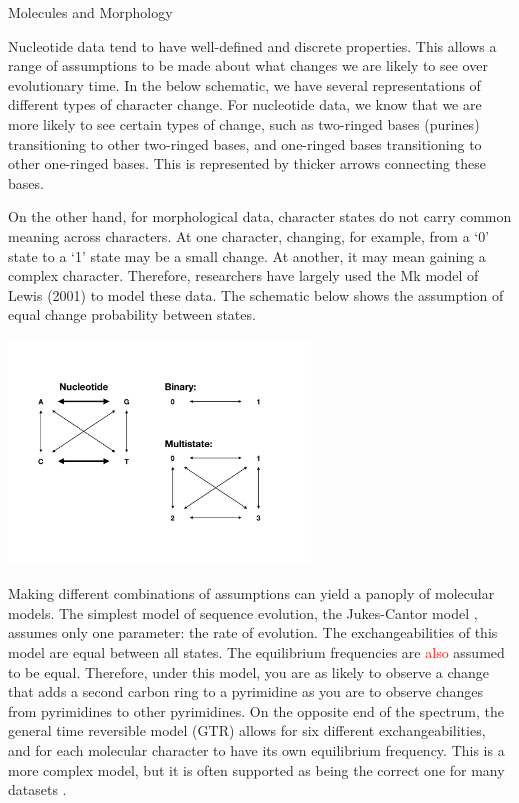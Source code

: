 \documentclass[11pt]{article}
\newcommand{\edit}[1]{{\textcolor{red}{#1}}} %
\begin{document}
\begin{boxedtext}{Molecules and Morphology}

Nucleotide data tend to have well-defined and discrete properties.
This allows a range of assumptions to be made about what changes we are likely to see over evolutionary time.
In the below schematic, we have several representations of different types of character change.
For nucleotide data, we know that we are more likely to see certain types of change, such as two-ringed bases (purines) transitioning to other two-ringed bases, and one-ringed bases transitioning to other one-ringed bases.
This is represented by thicker arrows connecting these bases.

On the other hand, for morphological data, character states do not carry common meaning across characters.
At one character, changing, for example, from a `0' state to a `1' state may be a small change.
At another, it may mean gaining a complex character.
Therefore, researchers have largely used the Mk model of Lewis (2001) to model these data.
The schematic below shows the assumption of equal change probability between states.


 \includegraphics[height=6cm]{figures/Q.pdf}
\label{fig:Q}

\end{boxedtext}

Making different combinations of assumptions can yield a panoply of molecular models.
The simplest model of sequence evolution, the Jukes-Cantor model \cite{Jukes1969}, assumes only one parameter: the rate of evolution.
The exchangeabilities of this model are equal between all states. 
The equilibrium frequencies are \edit{also} assumed to be equal.
Therefore, under this model, you are as likely to observe a change that adds a second carbon ring to a pyrimidine as you are to observe changes from pyrimidines to other pyrimidines.
On the opposite end of the spectrum, the general time reversible model (GTR) \cite{Tavare1986} allows for six different exchangeabilities, and for each molecular character to have its own equilibrium frequency.
This is a more complex model, but it is often supported as being the correct one for many datasets \cite{abadi2019}.
\end{document}
